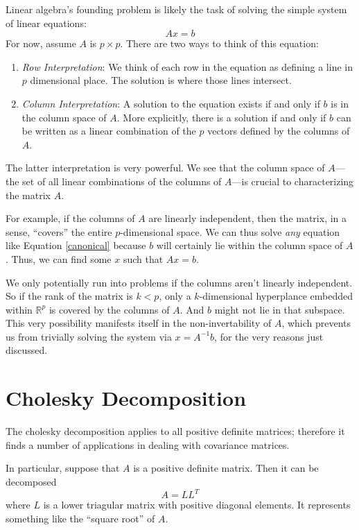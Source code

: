 \documentclass[12pt]{article}
\theoremstyle{plain}
\theoremstyle{definition}
\theoremstyle{remark}
\begin{document}
Linear algebra's founding problem is likely the task of solving the simple system of linear equations:
\begin{equation}
    \label{canonical}
    Ax = b
\end{equation}
For now, assume $A$ is $p\times p$. There are two ways to think of this equation:
\begin{enumerate}
    \item {\sl Row Interpretation}: We think of each row in the equation as defining a line in $p$ dimensional place. The solution is where those lines intersect.
    \item {\sl Column Interpretation}: A solution to the equation exists if and only if $b$ is in the column space of $A$. More explicitly, there is a solution if and only if $b$ can be written as a linear combination of the $p$ vectors defined by the columns of $A$.
\end{enumerate}
The latter interpretation is very powerful. We see that the column space of $A$---the set of all linear combinations of the columns of $A$---is crucial to characterizing the matrix $A$.

For example, if the columns of $A$ are linearly independent, then the matrix, in a sense, ``covers'' the entire $p$-dimensional space. We can thus solve \emph{any} equation like Equation \ref{canonical} because $b$ will certainly lie within the column space of $A$. Thus, we can find some $x$ such that $Ax=b$.

We only potentially run into problems if the columns aren't linearly independent. So if the rank of the matrix is $k<p$, only a $k$-dimensional hyperplance embedded within $\mathbb{R}^p$ is covered by the columns of $A$. And $b$ might not lie in that subspace. This very possibility manifests itself in the non-invertability of $A$, which prevents us from trivially solving the system via $x = A^{-1}b$, for the very reasons just discussed.


\section{Cholesky Decomposition}

The cholesky decomposition applies to all positive definite matrices;
therefore it finds a number of applications in dealing with covariance
matrices.

In particular, suppose that $A$ is a positive definite matrix. Then it
can be decomposed
\begin{equation}
  A = L L^T
\end{equation}
where $L$ is a lower triagular matrix with positive diagonal elements.
It represents something like the ``square root'' of $A$.
\end{document}
